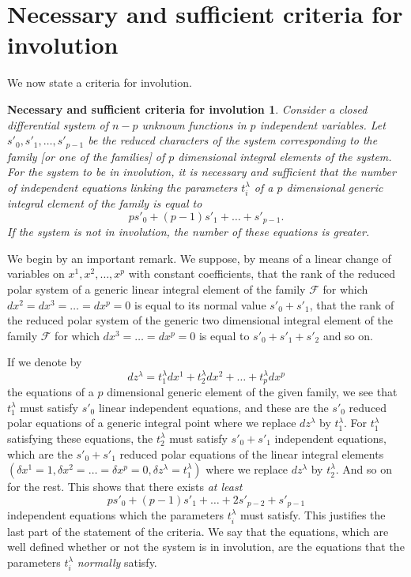 \section{Necessary and sufficient criteria for involution}
\label{sec:necess-suff-crit}

\fsec We now state a criteria for involution.

\theoremstyle{shape1}
\newtheorem*{cnsi}{\hspace{15pt}Necessary and sufficient criteria for involution}
\begin{cnsi}
  Consider a closed differential system of $n-p$ unknown functions in $p$ independent variables. Let $s'_{0},s'_{1},\dots,s'_{p-1}$ be the reduced characters of the system corresponding to the family [or one of the families] of $p$ dimensional integral elements of the system. For the system to be in involution, it is necessary and sufficient that the number of independent equations linking the parameters $t_{i}^{\lambda}$ of a $p$ dimensional generic integral element of the family is equal to 
\[
ps'_{0}+(p-1)s'_{1}+\dots+s'_{p-1}.
\]
If the system is not in involution, the number of these equations is greater.
\end{cnsi}


\vspace{12pt}\fsec We begin by an important remark. We suppose, by means of a linear change of variables on $x^{1},x^{2},\dots,x^{p}$ with constant coefficients, that the rank of the reduced polar system of a generic linear integral element of the family $\mathcal{F}$ for which $dx^{2}=dx^{3}=\dots=dx^{p}=0$ is equal to its normal value $s'_{0}+s'_{1}$, that the rank of the reduced polar system of the generic two dimensional integral element of the family $\mathcal{F}$ for which $dx^{3}=\dots=dx^{p}=0$ is equal to $s'_{0}+s'_{1}+s'_{2}$ and so on.

If we denote by
\[
dz^{\lambda}=t_{1}^{\lambda}dx^{1}+t_{2}^{\lambda}dx^{2}+\dots+t_{p}^{\lambda}dx^{p}
\]
the equations of a $p$ dimensional generic element of the given family, we see that $t_{1}^{\lambda}$ must satisfy $s'_{0}$ linear independent equations, and these are the $s'_{0}$ reduced polar equations of a generic integral point where we replace $dz^{\lambda}$ by $t_{1}^{\lambda}$. For $t_{1}^{\lambda}$ satisfying these equations, the $t_{2}^{\lambda}$ must satisfy $s'_{0}+s'_{1}$ independent equations, which are the $s'_{0}+s'_{1}$ reduced polar equations of the linear integral elements $(\delta x^{1}=1,\delta x^{2}=\dots=\delta x^{p}=0,\delta z^{\lambda}=t_{1}^{\lambda})$ where we replace $dz^{\lambda}$ by $t_{2}^{\lambda}$. And so on for the rest. This shows that there exists \emph{at least}
\[
ps'_{0}+(p-1)s'_{1}+\dots+2s'_{p-2}+s'_{p-1}
\]
independent equations which the parameters $t_{i}^{\lambda}$ must satisfy. This justifies the last part of the statement of the criteria. We say that the equations, which are well defined whether or not the system is in involution, are the equations that the parameters $t_{i}^{\lambda}$ \emph{normally} satisfy.


